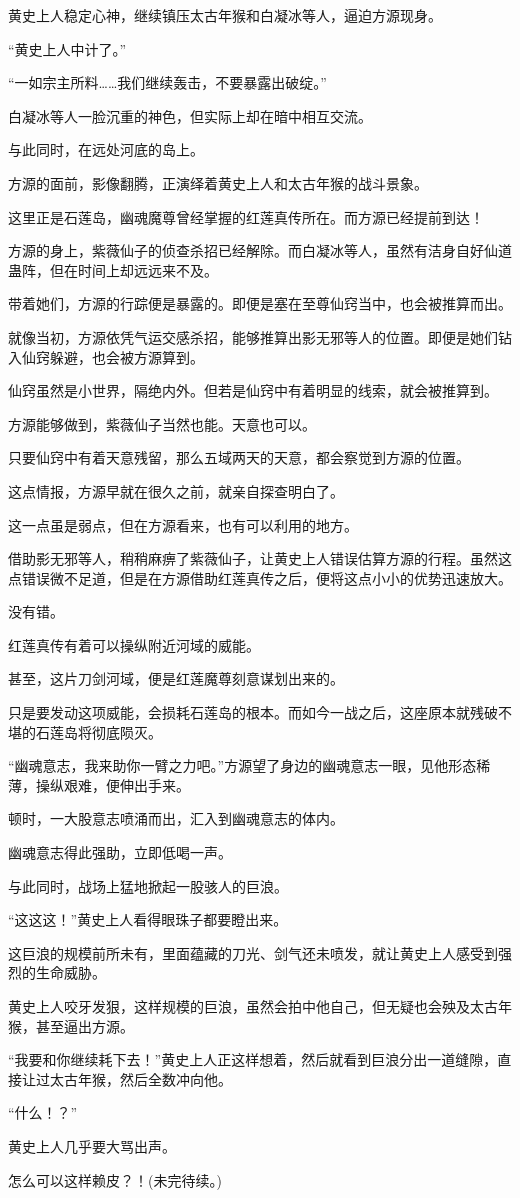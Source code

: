 \begin{this_body}
黄史上人稳定心神，继续镇压太古年猴和白凝冰等人，逼迫方源现身。

“黄史上人中计了。”

“一如宗主所料……我们继续轰击，不要暴露出破绽。”

白凝冰等人一脸沉重的神色，但实际上却在暗中相互交流。

与此同时，在远处河底的岛上。

方源的面前，影像翻腾，正演绎着黄史上人和太古年猴的战斗景象。

这里正是石莲岛，幽魂魔尊曾经掌握的红莲真传所在。而方源已经提前到达！

方源的身上，紫薇仙子的侦查杀招已经解除。而白凝冰等人，虽然有洁身自好仙道蛊阵，但在时间上却远远来不及。

带着她们，方源的行踪便是暴露的。即便是塞在至尊仙窍当中，也会被推算而出。

就像当初，方源依凭气运交感杀招，能够推算出影无邪等人的位置。即便是她们钻入仙窍躲避，也会被方源算到。

仙窍虽然是小世界，隔绝内外。但若是仙窍中有着明显的线索，就会被推算到。

方源能够做到，紫薇仙子当然也能。天意也可以。

只要仙窍中有着天意残留，那么五域两天的天意，都会察觉到方源的位置。

这点情报，方源早就在很久之前，就亲自探查明白了。

这一点虽是弱点，但在方源看来，也有可以利用的地方。

借助影无邪等人，稍稍麻痹了紫薇仙子，让黄史上人错误估算方源的行程。虽然这点错误微不足道，但是在方源借助红莲真传之后，便将这点小小的优势迅速放大。

没有错。

红莲真传有着可以操纵附近河域的威能。

甚至，这片刀剑河域，便是红莲魔尊刻意谋划出来的。

只是要发动这项威能，会损耗石莲岛的根本。而如今一战之后，这座原本就残破不堪的石莲岛将彻底陨灭。

“幽魂意志，我来助你一臂之力吧。”方源望了身边的幽魂意志一眼，见他形态稀薄，操纵艰难，便伸出手来。

顿时，一大股意志喷涌而出，汇入到幽魂意志的体内。

幽魂意志得此强助，立即低喝一声。

与此同时，战场上猛地掀起一股骇人的巨浪。

“这这这！”黄史上人看得眼珠子都要瞪出来。

这巨浪的规模前所未有，里面蕴藏的刀光、剑气还未喷发，就让黄史上人感受到强烈的生命威胁。

黄史上人咬牙发狠，这样规模的巨浪，虽然会拍中他自己，但无疑也会殃及太古年猴，甚至逼出方源。

“我要和你继续耗下去！”黄史上人正这样想着，然后就看到巨浪分出一道缝隙，直接让过太古年猴，然后全数冲向他。

“什么！？”

黄史上人几乎要大骂出声。

怎么可以这样赖皮？！(未完待续。)

\end{this_body}

